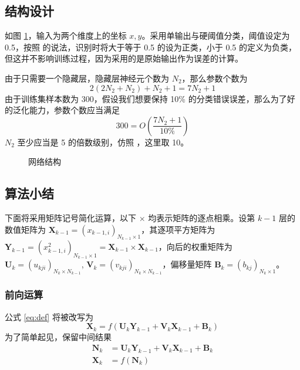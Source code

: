     \subsection{结构设计}

    如图 \ref{fig:network}，输入为两个维度上的坐标 $x,y$。采用单输出与硬阈值分类，阈值设定为 0.5，按照 \cite{gate} 的说法，识别时将大于等于 0.5 的设为正类，小于 0.5 的定义为负类，但这并不影响训练过程，因为采用的是原始输出作为误差的计算。

    由于只需要一个隐藏层，隐藏层神经元个数为 $N_2$，那么参数个数为
    \begin{equation*}
        2(2N_2+N_2) + N_2 + 1 = 7N_2 + 1
    \end{equation*}
    由于训练集样本数为 300，假设我们想要保持 10\% 的分类错误误差，那么为了好的泛化能力，参数个数应当满足
    \begin{equation*}
        300 = O\left(\frac{7N_2+1}{10\%}\right)
    \end{equation*}
    $N_2$ 至少应当是 5 的倍数级别，仿照 \cite{MLQP}，这里取 10。

    \begin{figure}[ht]
        \centering
        
        \caption{网络结构}\label{fig:network}
    \end{figure}

    \subsection{算法小结}

    下面将采用矩阵记号简化运算，以下 $\times$ 均表示矩阵的逐点相乘。设第 $k-1$ 层的数值矩阵为 $\mathbf{X}_{k-1}=(x_{k-1,i})_{N_{k-1}\times 1}$，其逐项平方矩阵为 $\mathbf{Y}_{k-1}=(x_{k-1,i}^2)_{N_{k-1}\times 1}=\mathbf{X}_{k-1}\times\mathbf{X}_{k-1}$，向后的权重矩阵为 $\mathbf{U}_{k}=(u_{kji})_{N_{k}\times N_{k-1}}$, $\mathbf{V}_{k}=(v_{kji})_{N_{k}\times N_{k-1}}$，偏移量矩阵 $\mathbf{B}_{k}=(b_{kj})_{N_{k}\times 1}$。

    \subsubsection{前向运算}

    公式 \eqref{eq:def} 将被改写为
    \begin{equation*}
        \mathbf{X}_{k} = f\left(\mathbf{U}_{k}\mathbf{Y}_{k-1} + \mathbf{V}_{k}\mathbf{X}_{k-1} + \mathbf{B}_{k}\right)
    \end{equation*}
    为了简单起见，保留中间结果 
    \begin{align}
        \mathbf{N}_{k}&=\mathbf{U}_{k}\mathbf{Y}_{k-1} + \mathbf{V}_{k}\mathbf{X}_{k-1} + \mathbf{B}_{k}\\
        \mathbf{X}_{k}&=f(\mathbf{N}_k)
    \end{align}


